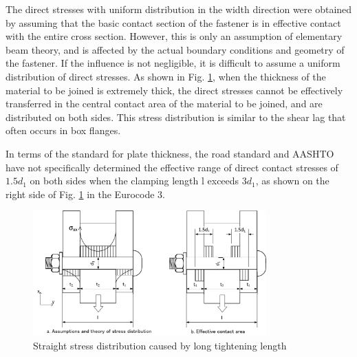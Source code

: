 
The direct stresses with uniform distribution in the width direction were obtained by assuming that the basic contact section of the fastener is in effective contact with the entire cross section. However, this is only an assumption of elementary beam theory, and is affected by the actual boundary conditions and geometry of the fastener. If the influence is not negligible, it is difficult to assume a uniform distribution of direct stresses. As shown in Fig. \ref{fig-bshearlag}, when the thickness of the material to be joined is extremely thick, the direct stresses cannot be effectively transferred in the central contact area of the material to be joined, and are distributed on both sides. This stress distribution is similar to the shear lag that often occurs in box flanges.

In terms of the standard for plate thickness, the road standard and AASHTO have not specifically determined the effective range of direct contact stresses of $1.5d_1$ on both sides when the clamping length l exceeds $3d_1$, as shown on the right side of Fig. \ref{fig-bshearlag} in the Eurocode 3.

\begin{figure}[htbp]
 \centering
 \includegraphics[width=0.8\textwidth]{imgs/app/boltlength-sl.pdf}
 \caption{Straight stress distribution caused by long tightening length}
 \label{fig-bshearlag}
\end{figure}

